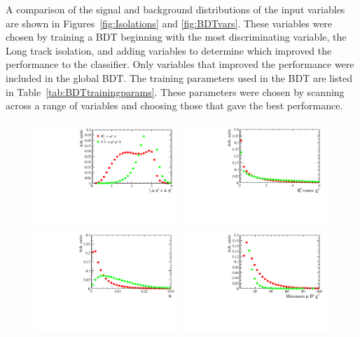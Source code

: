 A comparison of the signal and background distributions of the input variables are shown in Figures~\ref{fig:Isolations} and \ref{fig:BDTvars}. These variables were chosen by training a BDT beginning with the most discriminating variable, the Long track isolation, and adding variables to determine which improved the performance to the classifier. Only variables that improved the performance were included in the global BDT. The training parameters used in the BDT are listed in Table~\ref{tab:BDTtrainingparams}. These parameters were chosen by scanning across a range of variables and choosing those that gave the best performance. 

\begin{figure}[htbp]
    \centering
        \includegraphics[width=0.49\textwidth]{./Figs/Selection/var1_sim_all.pdf}
       \includegraphics[width=0.49\textwidth]{./Figs/Selection/var2_sim_all.pdf}
 \includegraphics[width=0.49\textwidth]{./Figs/Selection/var3_sim_all.pdf}
 \includegraphics[width=0.49\textwidth]{./Figs/Selection/var4_sim_all.pdf}

\end{figure}
